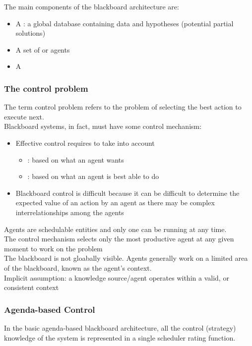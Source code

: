 The main components of the blackboard architecture are:
\begin{itemize}
\item A : a global database containing data and hypotheses (potential partial solutions)
\item A set of  or agents
\item A 
\end{itemize}
\subsubsection{The control problem}

The term control problem refers to the problem of selecting the best action to execute next.\\
Blackboard systems, in fact, must have some control mechanism:
\begin{itemize}
\item Effective control requires to take into account
\begin{itemize}
\item {}: based on what an agent wants
\item {}: based on what an agent is best able to do
\end{itemize}
\item Blackboard control is difficult because it can be difficult to determine the expected value of an action by an agent as there may be complex interrelationships among the agents
\end{itemize}
Agents are schedulable entities and only one can be running at any time.\\
The control mechanism selects only the most productive agent at any given moment to work on the problem\\
The blackboard is not gloabally visible. Agents generally work on a limited area of the blackboard, known as the agent's context.\\
Implicit assumption: a knowledge source/agent operates within a valid, or consistent context
\subsubsection{Agenda-based Control}
In the basic agenda-based blackboard architecture, all the control (strategy) knowledge of the system is represented in a single scheduler rating function.

